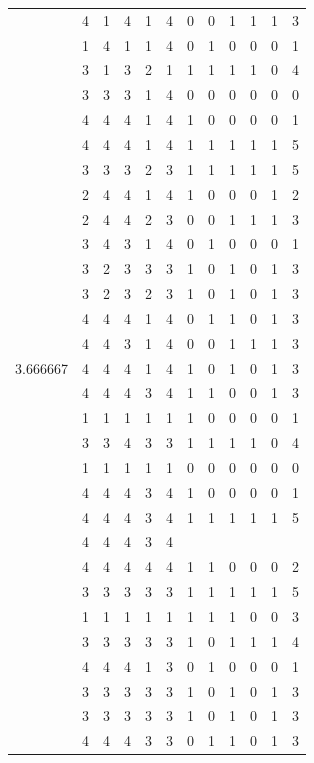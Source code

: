 \documentclass[]{book}
\theoremstyle{definition}
\theoremstyle{definition}
\theoremstyle{definition}
\theoremstyle{remark}
\begin{document}
\begin{table}
{\begin{tabular}[t]{rrrrrrrrrrrr}
 & 4 & 1 & 4 & 1 & 4 & 0 & 0 & 1 & 1 & 1 & 3\\
 & 1 & 4 & 1 & 1 & 4 & 0 & 1 & 0 & 0 & 0 & 1\\
 & 3 & 1 & 3 & 2 & 1 & 1 & 1 & 1 & 1 & 0 & 4\\
 & 3 & 3 & 3 & 1 & 4 & 0 & 0 & 0 & 0 & 0 & 0\\
 & 4 & 4 & 4 & 1 & 4 & 1 & 0 & 0 & 0 & 0 & 1\\
 & 4 & 4 & 4 & 1 & 4 & 1 & 1 & 1 & 1 & 1 & 5\\
 & 3 & 3 & 3 & 2 & 3 & 1 & 1 & 1 & 1 & 1 & 5\\
 & 2 & 4 & 4 & 1 & 4 & 1 & 0 & 0 & 0 & 1 & 2\\
 & 2 & 4 & 4 & 2 & 3 & 0 & 0 & 1 & 1 & 1 & 3\\
 & 3 & 4 & 3 & 1 & 4 & 0 & 1 & 0 & 0 & 0 & 1\\
 & 3 & 2 & 3 & 3 & 3 & 1 & 0 & 1 & 0 & 1 & 3\\
 & 3 & 2 & 3 & 2 & 3 & 1 & 0 & 1 & 0 & 1 & 3\\
 & 4 & 4 & 4 & 1 & 4 & 0 & 1 & 1 & 0 & 1 & 3\\
 & 4 & 4 & 3 & 1 & 4 & 0 & 0 & 1 & 1 & 1 & 3\\
3.666667 & 4 & 4 & 4 & 1 & 4 & 1 & 0 & 1 & 0 & 1 & 3\\
 & 4 & 4 & 4 & 3 & 4 & 1 & 1 & 0 & 0 & 1 & 3\\
 & 1 & 1 & 1 & 1 & 1 & 1 & 0 & 0 & 0 & 0 & 1\\
 & 3 & 3 & 4 & 3 & 3 & 1 & 1 & 1 & 1 & 0 & 4\\
 & 1 & 1 & 1 & 1 & 1 & 0 & 0 & 0 & 0 & 0 & 0\\
 & 4 & 4 & 4 & 3 & 4 & 1 & 0 & 0 & 0 & 0 & 1\\
 & 4 & 4 & 4 & 3 & 4 & 1 & 1 & 1 & 1 & 1 & 5\\
 & 4 & 4 & 4 & 3 & 4 &  &  &  &  &  & \\
 & 4 & 4 & 4 & 4 & 4 & 1 & 1 & 0 & 0 & 0 & 2\\
 & 3 & 3 & 3 & 3 & 3 & 1 & 1 & 1 & 1 & 1 & 5\\
 & 1 & 1 & 1 & 1 & 1 & 1 & 1 & 1 & 0 & 0 & 3\\
 & 3 & 3 & 3 & 3 & 3 & 1 & 0 & 1 & 1 & 1 & 4\\
 & 4 & 4 & 4 & 1 & 3 & 0 & 1 & 0 & 0 & 0 & 1\\
 & 3 & 3 & 3 & 3 & 3 & 1 & 0 & 1 & 0 & 1 & 3\\
 & 3 & 3 & 3 & 3 & 3 & 1 & 0 & 1 & 0 & 1 & 3\\
 & 4 & 4 & 4 & 3 & 3 & 0 & 1 & 1 & 0 & 1 & 3\\

\end{tabular}}
\end{table}
\end{document}
